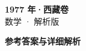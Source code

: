 \documentclass[zihao=-4, a4paper]{ctexart}
\begin{document}
\begin{center}
  {\Large\bfseries 1977 年·西藏卷}\\[4pt]
  {\large 数学 · 解析版}
\end{center}
\medskip
{}

\clearpage
{}
\begin{center}{\Large\bfseries 参考答案与详细解析}\end{center}
\medskip

\end{document}
